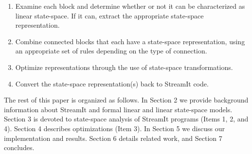 \begin{enumerate}
\vspace{\itemshrink} \item Examine each block and determine whether or not it can be
characterized as linear state-space. If it can, extract the
appropriate state-space representation.

\vspace{\itemshrink} \item Combine connected blocks that each have a state-space
representation, using an appropriate set of rules depending on the
type of connection.

\vspace{\itemshrink} \item Optimize representations through the use of state-space
transformations.

\vspace{\itemshrink} \item Convert the state-space representation(s) back to StreamIt
code.
\vspace{\itemshrink} \end{enumerate}


    The rest of this paper is organized as follows.  In Section 2 we
provide background information about StreamIt and formal linear
and linear state-space models.  Section 3 is devoted to
state-space analysis of StreamIt programs (Items 1, 2, and 4).
Section 4 describes optimizations (Item 3). In Section 5 we
discuss our implementation and results.  Section 6 details related
work, and Section 7 concludes.
